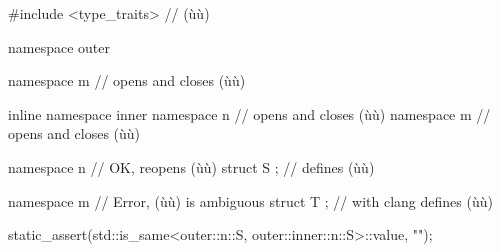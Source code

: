 \begin{emcppshiddenlisting}[emcppsbatch=e1]
#include <type_traits>  // (ù{}ù)
\end{emcppshiddenlisting}
\begin{emcppslisting}[emcppsbatch=e1,emcppserrorlines={17,18,19}]
namespace outer
{
    namespace m { }      // opens and closes (ù{}ù)

    inline namespace inner
    {
        namespace n { }  // opens and closes (ù{}ù)
        namespace m { }  // opens and closes (ù{}ù)
    }

    namespace n          // OK, reopens (ù{}ù)
    {
        struct S { };    // defines (ù{}ù)
    }

    namespace m          // Error, (ù{}ù) is ambiguous
    {
        struct T { };    // with clang defines (ù{}ù)
    }
}

static_assert(std::is_same<outer::n::S, outer::inner::n::S>::value, "");
\end{emcppslisting}
    
